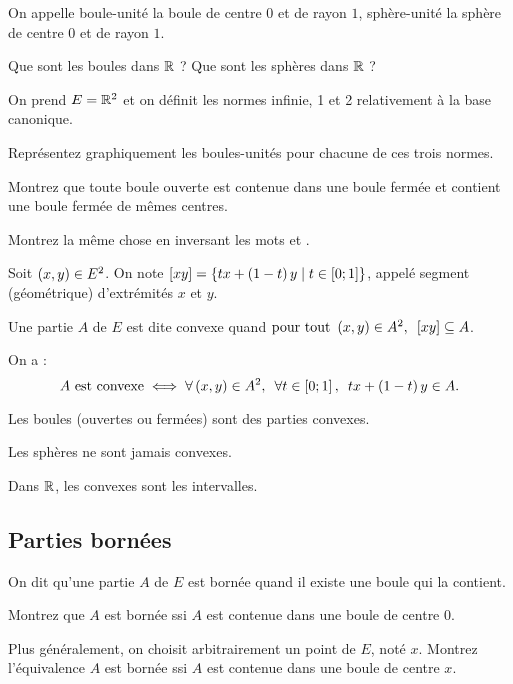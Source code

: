 On appelle boule-unité la boule de centre \(0\) et de rayon \(1\), sphère-unité la sphère de centre \(0\) et de rayon \(1\).

\begin{exo}
Que sont les boules dans \(\mathbb{R}\) ? Que sont les sphères dans \(\mathbb{R}\) ?
\end{exo}

\begin{exo}
On prend \(E=\mathbb{R}^2\) et on définit les normes infinie, 1 et 2 relativement à la base canonique.

Représentez graphiquement les boules-unités pour chacune de ces trois normes.
\end{exo}

\begin{exo}
Montrez que toute boule ouverte est contenue dans une boule fermée et contient une boule fermée de mêmes centres.

Montrez la même chose en inversant les mots  et .
\end{exo}

\begin{defi}
Soit \(\left(x,y\right)\in E^2\). On note \(\left[xy\right]=\left\lbrace tx+\left(1-t\right)y\;\middle|\; t\in\left[0;1\right]\right\rbrace\), appelé segment (géométrique) d'extrémités \(x\) et \(y\).

Une partie \(A\) de \(E\) est dite convexe quand \(\quantifs{\tpt\paren{x,y}\in A^2}\croch{xy}\subset A\).

On a : \[A\text{ est convexe}\ssi\quantifs{\forall\paren{x,y}\in A^2;\forall t\in\intervii{0}{1}}tx+\paren{1-t}y\in A.\]
\end{defi}

\begin{prop}
Les boules (ouvertes ou fermées) sont des parties convexes.

Les sphères ne sont jamais convexes.

Dans \(\mathbb{R}\), les convexes sont les intervalles.
\end{prop}

\subsection{Parties bornées}

\begin{defi}
On dit qu'une partie \(A\) de \(E\) est bornée quand il existe une boule qui la contient.
\end{defi}

\begin{exo}
Montrez que \(A\) est bornée ssi \(A\) est contenue dans une boule de centre \(0\).

Plus généralement, on choisit arbitrairement un point de \(E\), noté \(x\). Montrez l'équivalence \(A\) est bornée ssi \(A\) est contenue dans une boule de centre \(x\).
\end{exo}

